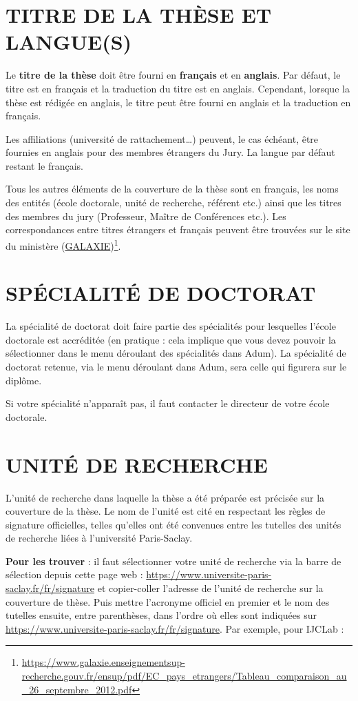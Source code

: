 \documentclass[french,12pt,a4paper]{book}
\begin{document}
\section{TITRE DE LA THÈSE ET LANGUE(S)}
Le \textbf{titre de la thèse} doit être fourni en \textbf{français} et en \textbf{anglais}. Par défaut, le titre est en français et la traduction du titre est en anglais. Cependant, lorsque la thèse est rédigée en anglais, le titre peut être fourni en anglais et la traduction en français.\\ \par
Les affiliations (université de rattachement…) peuvent, le cas échéant, être fournies en anglais pour des membres étrangers du Jury. La langue par défaut restant le français.\\ \par
Tous les autres éléments de la couverture de la thèse sont en français, les noms des entités (école doctorale, unité de recherche, référent etc.) ainsi que les titres des membres du jury (Professeur, Maître de Conférences etc.). Les correspondances entre titres étrangers et français peuvent être trouvées sur le site du ministère (\href{https://www.galaxie.enseignementsup-recherche.gouv.fr/ensup/pdf/EC_pays_etrangers/Tableau_comparaison_au_26_septembre_2012.pdf}{GALAXIE})\footnote{\url{https://www.galaxie.enseignementsup-recherche.gouv.fr/ensup/pdf/EC_pays_etrangers/Tableau_comparaison_au_26_septembre_2012.pdf}}.
\section{SPÉCIALITÉ DE DOCTORAT}
La spécialité de doctorat doit faire partie des spécialités pour lesquelles l’école doctorale est accréditée (en pratique : cela implique que vous devez pouvoir la sélectionner dans le menu déroulant des spécialités dans Adum).
La spécialité de doctorat retenue, via le menu déroulant dans Adum, sera celle qui figurera sur le diplôme.\\ \par
Si votre spécialité n’apparaît pas, il faut contacter le directeur de votre école doctorale.
\newpage
\section{UNITÉ DE RECHERCHE}
L’unité de recherche dans laquelle la thèse a été préparée est précisée sur la couverture de la thèse. Le nom de l’unité est cité en respectant les règles de signature officielles, telles qu’elles ont été convenues entre les tutelles des unités de recherche liées à l’université Paris-Saclay.\\ \par
\textbf{Pour les trouver} : il faut sélectionner votre unité de recherche via la barre de sélection depuis cette page web : \url{https://www.universite-paris-saclay.fr/fr/signature} et copier-coller l’adresse de l’unité de recherche sur la couverture de thèse. 
Puis mettre l’acronyme officiel en  premier et le nom des tutelles ensuite, entre parenthèses, dans l’ordre où elles sont indiquées sur \url{https://www.universite-paris-saclay.fr/fr/signature}.
Par exemple, pour IJCLab :
\end{document}
